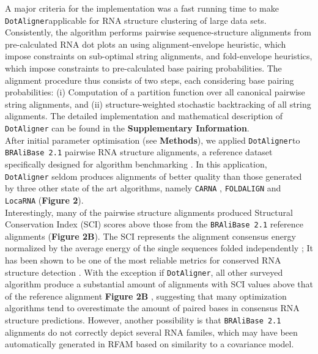 \documentclass{bmcart}
\newcommand\dotaligner{\texttt{DotAligner}}
\newcommand\bralibase{\texttt{BRAliBase 2.1}}
\newcommand\locarna{\texttt{LocaRNA}}
\newcommand\foldalign{\texttt{FOLDALIGN}}
\newcommand\carna{\texttt{CARNA}}
\begin{document}
A major criteria for the implementation was a fast running time to make 
\dotaligner applicable for RNA structure clustering of large data sets.
Consistently, the algorithm performs pairwise sequence-structure alignments from 
pre-calculated RNA dot plots an using alignment-envelope heuristic, which 
impose constraints on sub-optimal string alignments, and fold-envelope 
heuristics, which impose constraints to pre-calculated base pairing probabilities.
The alignment procedure thus consists of two steps, each considering base pairing  
probabilities: (i) Computation of a partition function over all canonical pairwise 
string alignments, and (ii) structure-weighted stochastic backtracking of 
all string alignments. The detailed implementation and mathematical description 
of \dotaligner{} can be found  in the \textbf{Supplementary Information}.\\

After initial parameter optimisation (see \textbf{Methods}), we applied 
\dotaligner  to  \bralibase{} pairwise RNA structure alignments, a reference 
dataset specifically designed for algorithm benchmarking 
\cite{Gardner15860779,wilm2006enhanced}. In this application, \dotaligner{} seldom 
produces alignments of better quality than those generated by three other 
state of the art algorithms, namely \carna{} \cite{Sorescu2012}, \foldalign{} 
\cite{havgaard2007fast,sundfeld2015foldalign} and \locarna{} \cite{Will17432929}
(\textbf{Figure 2}).\\

Interestingly, many of the pairwise structure alignments produced Structural 
Conservation Index (SCI) scores above those from the \bralibase{} reference alignments 
(\textbf{Figure 2B}). The SCI represents the alignment consensus energy normalized
 by the average energy of the single sequences folded independently \cite{washietl2005fast}; 
It has been shown to be one of the most reliable metrics for conserved RNA structure 
detection \cite{gruber2008strategies}. With the exception if \dotaligner{}, all other 
surveyed algorithm produce a substantial amount of alignments with SCI values 
above that of the reference  alignment \textbf{Figure 2B }, suggesting that many optimization 
algorithms tend to overestimate the amount of paired bases in consensus RNA structure predictions. 
However, another possibility is that \bralibase{} alignments do not correctly depict several RNA familes, 
which may have been automatically generated in RFAM based on similarity to a covariance model.\\
\end{document}
